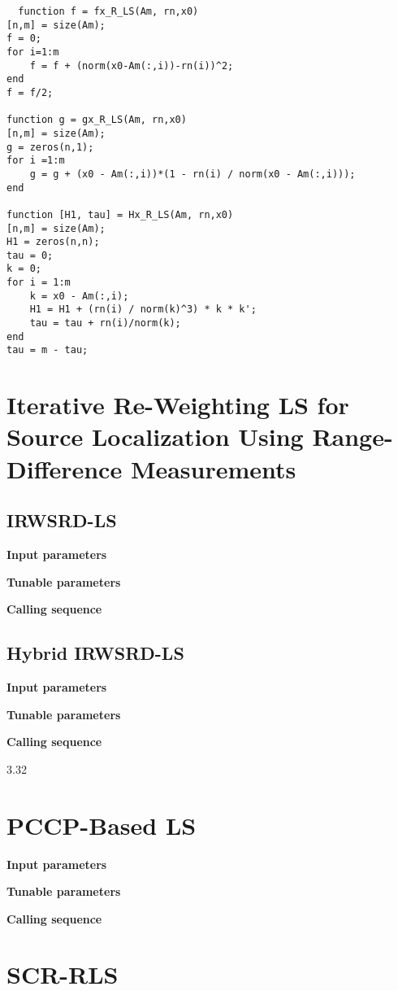 \begin{lstlisting}
  function f = fx_R_LS(Am, rn,x0)
[n,m] = size(Am);
f = 0;
for i=1:m
    f = f + (norm(x0-Am(:,i))-rn(i))^2;
end
f = f/2;

function g = gx_R_LS(Am, rn,x0)
[n,m] = size(Am);
g = zeros(n,1);
for i =1:m
    g = g + (x0 - Am(:,i))*(1 - rn(i) / norm(x0 - Am(:,i)));
end

function [H1, tau] = Hx_R_LS(Am, rn,x0)
[n,m] = size(Am);
H1 = zeros(n,n);
tau = 0;
k = 0;
for i = 1:m
    k = x0 - Am(:,i);
    H1 = H1 + (rn(i) / norm(k)^3) * k * k';
    tau = tau + rn(i)/norm(k);
end
tau = m - tau;
 \end{lstlisting}

\section{Iterative Re-Weighting LS  for Source Localization Using Range-Difference Measurements}
\subsection{IRWSRD-LS}

\noindent
\textbf{Input parameters}

\noindent
\textbf{Tunable parameters}

\noindent
\textbf{Calling sequence} 

\subsection{Hybrid IRWSRD-LS}

\noindent
\textbf{Input parameters}

\noindent
\textbf{Tunable parameters}

\noindent
\textbf{Calling sequence}

3.32

\section{PCCP-Based LS}

\noindent
\textbf{Input parameters}

\noindent
\textbf{Tunable parameters}

\noindent
\textbf{Calling sequence}

\section{SCR-RLS}

